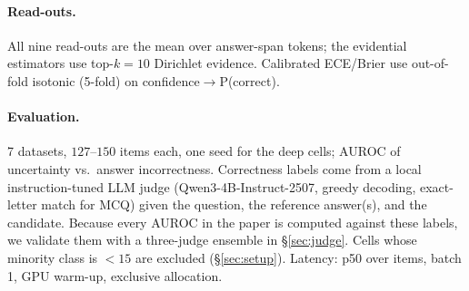 \documentclass[11pt]{article}
\begin{document}
\paragraph{Read-outs.} All nine read-outs are the mean over answer-span tokens; the
evidential estimators use top-$k{=}10$ Dirichlet evidence. Calibrated ECE/Brier use
out-of-fold isotonic (5-fold) on confidence$\to$P(correct).
\paragraph{Evaluation.} 7 datasets, $127$--$150$ items each, one seed for the deep cells; AUROC
of uncertainty vs.\ answer incorrectness. Correctness labels come from a local
instruction-tuned LLM judge (Qwen3-4B-Instruct-2507, greedy decoding, exact-letter match for
MCQ) given the question, the reference answer(s), and the candidate. Because every AUROC in the
paper is computed against these labels, we validate them with a three-judge ensemble in
\S\ref{sec:judge}. Cells whose minority class is $<15$ are excluded (\S\ref{sec:setup}).
Latency: p50 over items, batch 1, GPU warm-up, exclusive allocation.
\end{document}
